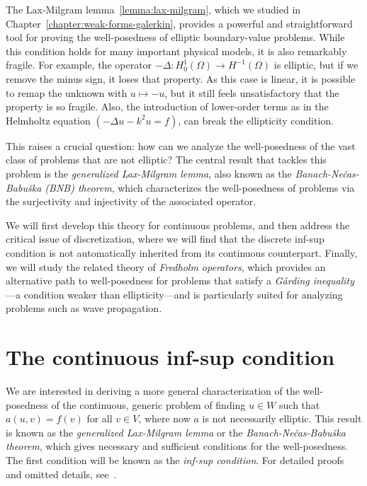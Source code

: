 The Lax-Milgram lemma~\ref{lemma:lax-milgram}, which we studied in Chapter~\ref{chapter:weak-forms-galerkin}, provides a powerful and straightforward tool for proving the well-posedness of elliptic boundary-value problems. While this condition holds for many important physical models, it is also remarkably fragile. For example, the operator $-\Delta: H_0^1(\Omega)\to H^{-1}(\Omega)$ is elliptic, but if we remove the minus sign, it loses that property. As this case is linear, it is possible to remap the unknown with $u\mapsto -u$, but it still feels unsatisfactory that the property is so fragile. Also, the introduction of lower-order terms as in the Helmholtz equation $(-\Delta u - k^2 u = f)$, can break the ellipticity condition.

This raises a crucial question: how can we analyze the well-posedness of the vast class of problems that are not elliptic? The central result that tackles this problem is the \emph{generalized Lax-Milgram lemma}, also known as the \emph{Banach-Ne\v{c}as-Babu\v{s}ka (BNB) theorem}, which characterizes the well-posedness of problems via the surjectivity and injectivity of the associated operator.

We will first develop this theory for continuous problems, and then address the critical issue of discretization, where we will find that the discrete inf-sup condition is not automatically inherited from its continuous counterpart. Finally, we will study the related theory of \emph{Fredholm operators}, which provides an alternative path to well-posedness for problems that satisfy a \emph{Gårding inequality}---a condition weaker than ellipticity---and is particularly suited for analyzing problems such as wave propagation.

\section{The continuous inf-sup condition}\label{sec:inf-sup}
We are interested in deriving a more general characterization of the well-posedness of the continuous, generic problem of finding $u\in W$ such that $a(u,v)=f(v)$ for all $v\in V$, where now $a$ is not necessarily elliptic. This result is known as the \emph{generalized Lax-Milgram lemma} or the \emph{Banach-Ne\v{c}as-Babu\v{s}ka theorem}, which gives necessary and sufficient conditions for the well-posedness. The first condition will be known as the \emph{inf-sup condition}. For detailed proofs and omitted details, see~\cite{ern2004theory, chen2024infSup, gatica2014simple}. 

